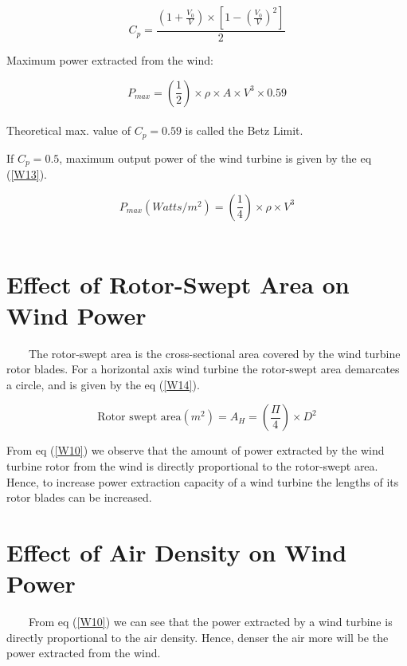 \begin{equation}
\label{W11}
C_p = \frac{\left(1 + \frac{V_0}{V}\right)\times \left[1 - \left(\frac{V_0}{V}\right)^2\right]}{2}
\end{equation}

Maximum power extracted from the wind:

\begin{equation}
\label{W12}
P_{max} = \left(\frac{1}{2}\right) \times \rho \times A \times V^3 \times 0.59
\end{equation}\\

Theoretical max. value of $C_p = 0.59$ is called the Betz Limit.

If $C_p = 0.5$, maximum output power of the wind turbine is given by the eq (\ref{W13}).

\begin{equation}
\label{W13}
\text{$P_{max} (Watts/m^2)$}= \left(\frac{1}{4}\right) \times \rho \times V^3 
\end{equation}\\


\section{Effect of Rotor-Swept Area on Wind Power}
\
\
\
\
The rotor-swept area is the cross-sectional area covered by the wind turbine rotor blades. For a horizontal axis wind turbine the rotor-swept area demarcates a circle, and is given by the eq (\ref{W14}).
	
\begin{equation}
\label{W14}
	\text{Rotor swept area}(m^2) = A_H = \left(\frac{\Pi}{4}\right) \times D^2
\end{equation}

From eq (\ref{W10}) we observe that the amount of power extracted by the wind turbine rotor from the wind is directly proportional to the rotor-swept area. Hence, to increase power extraction capacity of a wind turbine the lengths of its rotor blades can be increased.

\section{Effect of Air Density on Wind Power}
\
\
\
\
From eq (\ref{W10}) we can see that the power extracted by a wind turbine is directly proportional to the air density. Hence, denser the air more will be the power extracted from the wind.\\

